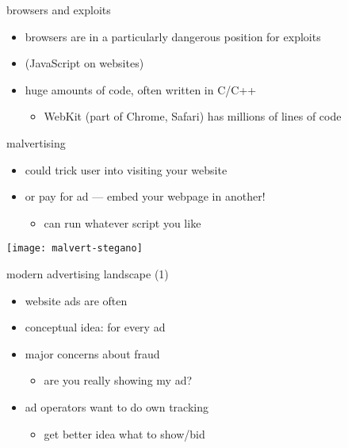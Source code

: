 \begin{frame}{browsers and exploits}
    \begin{itemize}
    \item browsers are in a particularly dangerous position for exploits
    \item {} (JavaScript on websites)
    \item huge amounts of code, often written in C/C++
        \begin{itemize}
            \item WebKit (part of Chrome, Safari) has millions of lines of code
        \end{itemize}
    \end{itemize}
\end{frame}

\begin{frame}{malvertising}
    \begin{itemize}
    \item could trick user into visiting your website
        \vspace{.5cm}
    \item or pay for ad --- embed your webpage in another!
        \begin{itemize}
        \item can run whatever script you like
        \end{itemize}
    \end{itemize}
    \texttt{[image: malvert-stegano]}
\end{frame}

\begin{frame}{modern advertising landscape (1)}
    \begin{itemize}
        \item website ads are often 
        \item conceptual idea:  for every ad
        \item major concerns about fraud
            \begin{itemize}
            \item are you really showing my ad?
            \end{itemize}
        \item ad operators want to do own tracking
            \begin{itemize}
            \item get better idea what to show/bid
            \end{itemize}
    \end{itemize}
\end{frame}

